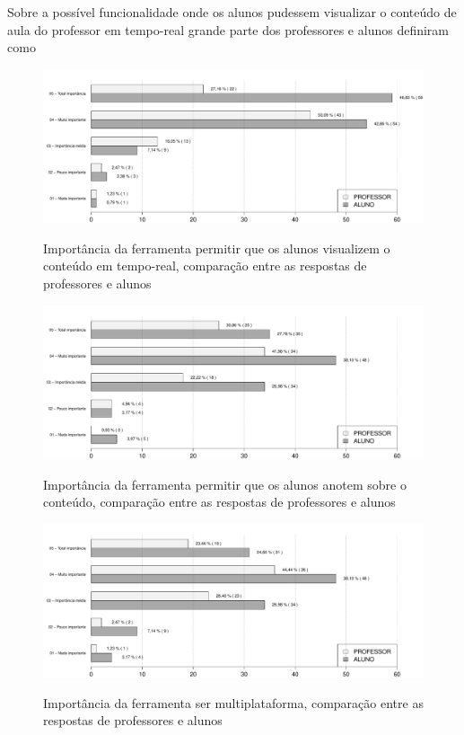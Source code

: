 Sobre a possível funcionalidade onde os alunos pudessem visualizar o conteúdo de aula do professor em tempo-real grande parte dos professores e alunos definiram como 

\begin{figure}[!h]
\centering
\caption{Importância da ferramenta permitir que os alunos visualizem o conteúdo em tempo-real, comparação entre as respostas de professores e alunos}
\includegraphics[width=1.0\textwidth]{pdfs/alunos-professores/funcionalidades-visualizar-conteudo.pdf} 
\label{fig:grafico_visualizar} 
\end{figure}


\begin{figure}[!h]
\centering
\caption{Importância da ferramenta permitir que os alunos anotem sobre o conteúdo, comparação entre as respostas de professores e alunos}
\includegraphics[width=1.0\textwidth]{pdfs/alunos-professores/funcionalidades-anotacoes.pdf} 
\label{fig:grafico_anotacoes} 
\end{figure}

\begin{figure}[!h]
\centering
\caption{Importância da ferramenta ser multiplataforma, comparação entre as respostas de professores e alunos}
\includegraphics[width=1.0\textwidth]{pdfs/alunos-professores/funcionalidades-compar-anotacoes.pdf} 
\label{fig:grafico_multiplataforma} 
\end{figure}


